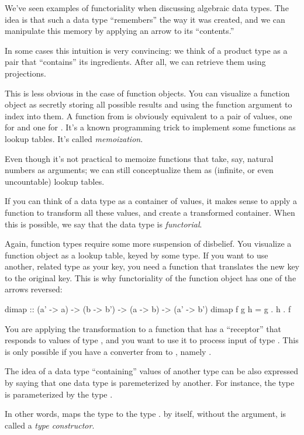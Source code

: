 \documentclass[DaoFP]{subfiles}
\begin{document}
We've seen examples of functoriality when discussing algebraic data types. The idea is that such a data type ``remembers'' the way it was created, and we can manipulate this memory by applying an arrow to its ``contents.'' 

In some cases this intuition is very convincing: we think of a product type as a pair that ``contains'' its ingredients. After all, we can retrieve them using projections. 

This is less obvious in the case of function objects. You can visualize a function object as secretly storing all possible results and using the function argument to index into them. A function from  is obviously equivalent to a pair of values, one for  and one for . It's a known programming trick to implement some functions as lookup tables. It's called \emph{memoization}. 

Even though it's not practical to memoize functions that take, say, natural numbers as arguments; we can still conceptualize them as (infinite, or even uncountable) lookup tables.

If you can think of a data type as a container of values, it makes sense to apply a function to transform all these values, and create a transformed container. When this is possible, we say that the data type is \emph{functorial}. 

Again, function types require some more suspension of disbelief. You visualize a function object as a lookup table, keyed by some type. If you want to use another, related type as your key, you need a function that translates the new key to the original key. This is why functoriality of the function object has one of the arrows reversed:
\begin{haskell}
dimap :: (a' -> a) -> (b -> b') -> (a -> b) -> (a' -> b')
dimap f g h = g . h . f
\end{haskell}
You are applying the transformation to a function  that has a ``receptor'' that responds to values of type , and you want to use it to process input of type . This is only possible if you have a converter from  to , namely .


The idea of a data type ``containing'' values of another type can be also expressed by saying that one data type is paremeterized by another. For instance, the type  is parameterized by the type . 

In other words,  maps the type  to the type .  by itself, without the argument, is called a \emph{type constructor}. 
\end{document}
